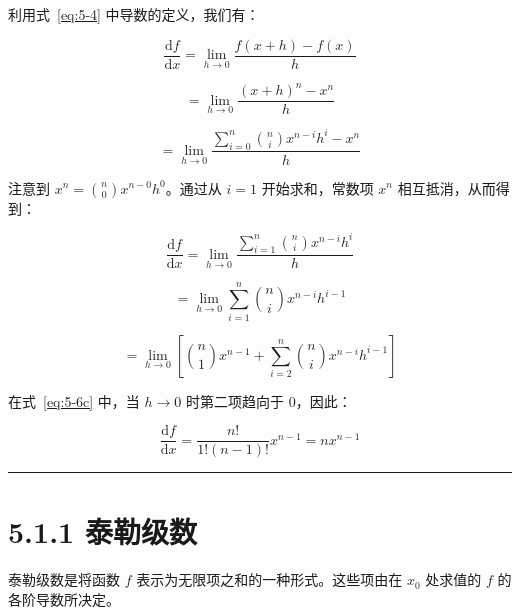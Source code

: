 \begin{notebox}
利用式~\eqref{eq:5-4} 中导数的定义，我们有：

\begin{equation}
\frac{\mathrm{d}f}{\mathrm{d}x} = \lim_{h \to 0} \frac{f(x + h) - f(x)}{h}
\tag{5.5a}\label{eq:5-5a}
\end{equation}

\begin{equation}
= \lim_{h \to 0} \frac{(x + h)^n - x^n}{h}
\tag{5.5b}\label{eq:5-5b}
\end{equation}

\begin{equation}
= \lim_{h \to 0} \frac{\sum_{i=0}^n \binom{n}{i} x^{n-i} h^i - x^n}{h}
\tag{5.5c}\label{eq:5-5c}
\end{equation}

注意到 $ x^n = \binom{n}{0} x^{n-0} h^0 $。通过从 $ i = 1 $ 开始求和，常数项 $ x^n $ 相互抵消，从而得到：

\begin{equation}
\frac{\mathrm{d}f}{\mathrm{d}x} = \lim_{h \to 0} \frac{\sum_{i=1}^n \binom{n}{i} x^{n-i} h^i}{h}
\tag{5.6a}\label{eq:5-6a}
\end{equation}

\begin{equation}
= \lim_{h \to 0} \sum_{i=1}^n \binom{n}{i} x^{n-i} h^{i-1}
\tag{5.6b}\label{eq:5-6b}
\end{equation}

\begin{equation}
= \lim_{h \to 0} \left[ \binom{n}{1} x^{n-1} + \sum_{i=2}^n \binom{n}{i} x^{n-i} h^{i-1} \right]
\tag{5.6c}\label{eq:5-6c}
\end{equation}

在式~\eqref{eq:5-6c} 中，当 $ h \to 0 $ 时第二项趋向于 0，因此：

\begin{equation}
\frac{\mathrm{d}f}{\mathrm{d}x} = \frac{n!}{1!(n - 1)!} x^{n-1} = n x^{n-1}
\tag{5.6d}\label{eq:5-6d}
\end{equation}
\end{notebox}

\medskip\hrule\medskip

\section*{5.1.1 泰勒级数}

泰勒级数是将函数 $ f $ 表示为无限项之和的一种形式。这些项由在 $ x_0 $ 处求值的 $ f $ 的各阶导数所决定。

